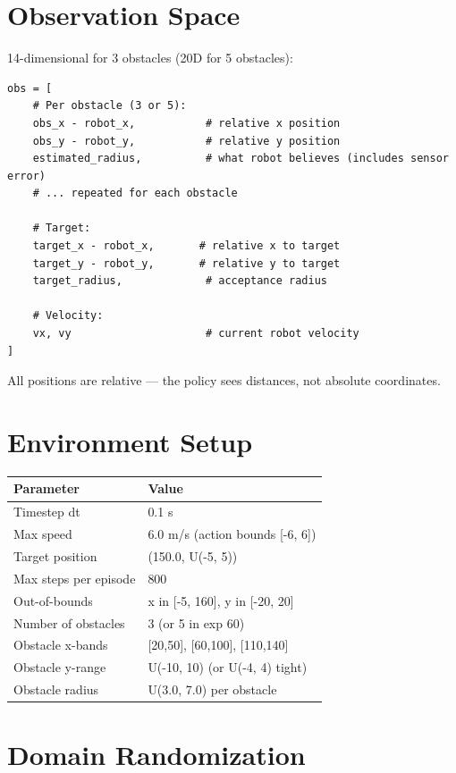 \documentclass[11pt]{article}
\begin{document}
\section*{Observation Space}

14-dimensional for 3 obstacles (20D for 5 obstacles):

\begin{verbatim}
obs = [
    # Per obstacle (3 or 5):
    obs_x - robot_x,           # relative x position
    obs_y - robot_y,           # relative y position
    estimated_radius,          # what robot believes (includes sensor error)
    # ... repeated for each obstacle

    # Target:
    target_x - robot_x,       # relative x to target
    target_y - robot_y,       # relative y to target
    target_radius,             # acceptance radius

    # Velocity:
    vx, vy                     # current robot velocity
]
\end{verbatim}

All positions are relative --- the policy sees distances, not absolute coordinates.


\section*{Environment Setup}

\begin{tabular}{ll}
\toprule
Parameter & Value \\
\midrule
Timestep dt & 0.1 s \\
Max speed & 6.0 m/s (action bounds [-6, 6]) \\
Target position & (150.0, U(-5, 5)) \\
Max steps per episode & 800 \\
Out-of-bounds & x in [-5, 160], y in [-20, 20] \\
Number of obstacles & 3 (or 5 in exp 60) \\
Obstacle x-bands & [20,50], [60,100], [110,140] \\
Obstacle y-range & U(-10, 10) (or U(-4, 4) tight) \\
Obstacle radius & U(3.0, 7.0) per obstacle \\
\bottomrule
\end{tabular}


\section*{Domain Randomization}
\end{document}
